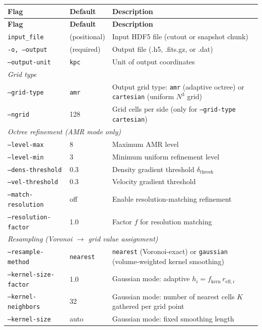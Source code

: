 \documentclass[english,a4paper]{my_memo}
\begin{document}
\begin{longtable}{p{4.5cm}p{2.5cm}p{7cm}}
\toprule
\textbf{Flag} & \textbf{Default} & \textbf{Description} \\
\midrule
\endfirsthead
\toprule
\textbf{Flag} & \textbf{Default} & \textbf{Description} \\
\midrule
\endhead

\texttt{input\_file}  & (positional) & Input HDF5 file (cutout or snapshot chunk) \\
\texttt{-o, --output}  & (required) & Output file (.h5, .fits.gz, or .dat) \\
\texttt{--output-unit}  & \texttt{kpc} & Unit of output coordinates \\
\midrule
\multicolumn{3}{l}{\textit{Grid type}} \\
\texttt{--grid-type}  & \texttt{amr} & Output grid type: \texttt{amr} (adaptive octree)
  or \texttt{cartesian} (uniform $N^3$ grid) \\
\texttt{--ngrid}  & 128 & Grid cells per side (only for \texttt{--grid-type cartesian}) \\
\midrule
\multicolumn{3}{l}{\textit{Octree refinement (AMR mode only)}} \\
\texttt{--level-max}  & 8 & Maximum AMR level \\
\texttt{--level-min}  & 3 & Minimum uniform refinement level \\
\texttt{--dens-threshold}  & 0.3 & Density gradient threshold $\delta_\mathrm{thresh}$ \\
\texttt{--vel-threshold}   & 0.3 & Velocity gradient threshold \\
\texttt{--match-resolution}  & off & Enable resolution-matching refinement \\
\texttt{--resolution-factor} & 1.0 & Factor $f$ for resolution matching \\
\midrule
\multicolumn{3}{l}{\textit{Resampling (Voronoi $\rightarrow$ grid value assignment)}} \\
\texttt{--resample-method}
  & \texttt{nearest}
  & \texttt{nearest} (Voronoi-exact) or \texttt{gaussian}
    (volume-weighted kernel smoothing) \\
\texttt{--kernel-size-factor} & 1.0 & Gaussian mode: adaptive
  $h_i = f_\mathrm{kern}\,r_{\mathrm{eff},i}$ \\
\texttt{--kernel-neighbors}  & 32 & Gaussian mode: number of nearest
  cells $K$ gathered per grid point \\
\texttt{--kernel-size}  & auto & Gaussian mode: fixed smoothing length

\end{longtable}
\end{document}
